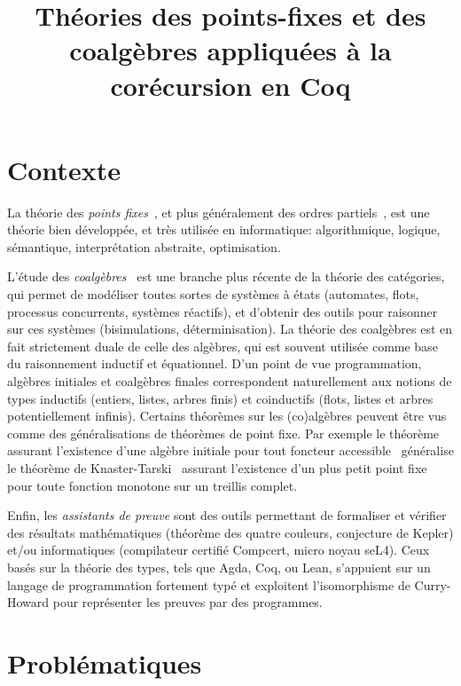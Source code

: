 \documentclass[a4paper,11pt]{article}
\title{Théories des points-fixes et des coalgèbres appliquées à la corécursion en Coq}
\begin{document}
\maketitle

\section{Contexte}

La théorie des \emph{points fixes}~\cite{BIR67a}, et plus généralement des ordres partiels~\cite{DaveyPriestley90}, est une théorie bien développée, et très utilisée en informatique: algorithmique, logique, sémantique, interprétation abstraite, optimisation.

L'étude des \emph{coalgèbres}~\cite{jacobs:book} est une branche plus récente de la théorie des catégories, qui permet de modéliser toutes sortes de systèmes à états (automates, flots, processus concurrents, systèmes réactifs), et d'obtenir des outils pour raisonner sur ces systèmes (bisimulations, déterminisation).
%
La théorie des coalgèbres est en fait strictement duale de celle des algèbres, qui est souvent utilisée comme base du raisonnement inductif et équationnel. D'un point de vue programmation, algèbres initiales et coalgèbres finales correspondent naturellement aux notions de types inductifs (entiers, listes, arbres finis) et coinductifs (flots, listes et arbres potentiellement infinis).
%
Certains théorèmes sur les (co)algèbres peuvent être vus comme des généralisations de théorèmes de point fixe. Par exemple le théorème assurant l'existence d'une algèbre initiale pour tout foncteur accessible~\cite{adamek1974free} généralise le théorème de Knaster-Tarski~\cite{Kna28,Tarski55} assurant l'existence d'un plus petit point fixe pour toute fonction monotone sur un treillis complet.

Enfin, les \emph{assistants de preuve} sont des outils permettant de formaliser et vérifier des résultats mathématiques (théorème des quatre couleurs, conjecture de Kepler) et/ou informatiques (compilateur certifié Compcert, micro noyau seL4). Ceux basés sur la théorie des types, tels que Agda, Coq, ou Lean, s'appuient sur un langage de programmation fortement typé et exploitent l'isomorphisme de Curry-Howard pour représenter les preuves par des programmes.

\section{Problématiques}
\end{document}
